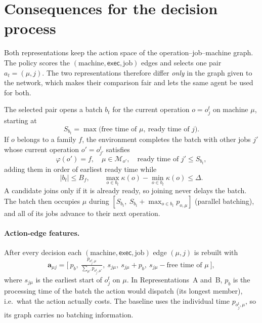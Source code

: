 \documentclass[11pt,a4paper]{article}
\newcommand{\Mset}{\mathcal{M}}
\begin{document}
\section{Consequences for the decision process}
\label{sec:mdp}

Both representations keep the action space of the operation--job--machine graph.
The policy scores the $(\text{machine},\textsf{exec},\text{job})$ edges and selects
one pair $a_t=(\mu,j)$. The two representations therefore differ \emph{only} in
the graph given to the network, which makes their comparison fair and lets the
same agent be used for both.

The selected pair opens a batch $b_t$ for the current operation $o=o_j^t$ on
machine $\mu$, starting at
\begin{equation}
  S_{b_t}=\max\bigl(\text{free time of }\mu,\ \text{ready time of } j\bigr).
\end{equation}
If $o$ belongs to a family $f$, the environment completes the batch with other
jobs $j'$ whose current operation $o'=o_{j'}^t$ satisfies
\begin{equation}
  \varphi(o')=f,\quad \mu\in\Mset_{o'},\quad \text{ready time of } j'\le S_{b_t},
\end{equation}
adding them in order of earliest ready time while
\begin{equation}
  |b_t|\le B_f,\qquad \max_{o\in b_t}\kappa(o)-\min_{o\in b_t}\kappa(o)\le\Delta .
\end{equation}
A candidate joins only if it is already ready, so joining never delays the batch.
The batch then occupies $\mu$ during
$[S_{b_t},\ S_{b_t}+\max_{o\in b_t}p_{o,\mu}]$ (parallel batching), and all of
its jobs advance to their next operation.

\paragraph{Action-edge features.} After every decision each
$(\text{machine},\textsf{exec},\text{job})$ edge $(\mu,j)$ is rebuilt with
\begin{equation}
  \mathbf{a}_{\mu j}=\bigl[\ p_{b},\ \tfrac{p_{o_j^t,\mu}}{\sum_{\mu'}p_{o_j^t,\mu'}},\ s_{j\mu},\ s_{j\mu}+p_{b},\ s_{j\mu}-\text{free time of }\mu\ \bigr],
\end{equation}
where $s_{j\mu}$ is the earliest start of $o_j^t$ on $\mu$. In Representations~A
and~B, $p_b$ is the processing time of the batch the action would dispatch (its
longest member), i.e.\ what the action actually costs. The baseline uses the
individual time $p_{o_j^t,\mu}$, so its graph carries no batching information.
\end{document}
